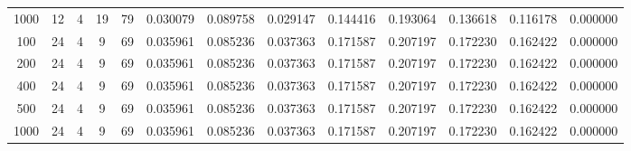 \begin{table}[h]
\begin{tabular}{ccccccccccccc}
1000 & 12 & 4 & 19 & 79 & 0.030079 & 0.089758 & 0.029147 & 0.144416 & 0.193064 & 0.136618 & 0.116178 & 0.000000 \\
100 & 24 & 4 & 9 & 69 & 0.035961 & 0.085236 & 0.037363 & 0.171587 & 0.207197 & 0.172230 & 0.162422 & 0.000000 \\
200 & 24 & 4 & 9 & 69 & 0.035961 & 0.085236 & 0.037363 & 0.171587 & 0.207197 & 0.172230 & 0.162422 & 0.000000 \\
400 & 24 & 4 & 9 & 69 & 0.035961 & 0.085236 & 0.037363 & 0.171587 & 0.207197 & 0.172230 & 0.162422 & 0.000000 \\
500 & 24 & 4 & 9 & 69 & 0.035961 & 0.085236 & 0.037363 & 0.171587 & 0.207197 & 0.172230 & 0.162422 & 0.000000 \\
1000 & 24 & 4 & 9 & 69 & 0.035961 & 0.085236 & 0.037363 & 0.171587 & 0.207197 & 0.172230 & 0.162422 & 0.000000 \\
\bottomrule
\end{tabular}
\end{table}
